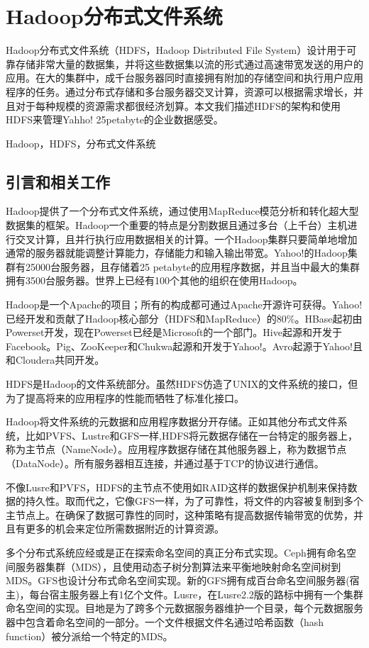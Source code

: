\chapter{Hadoop分布式文件系统}

\ECUSTabstract Hadoop分布式文件系统（HDFS，Hadoop Distributed File System）设计用于可靠存储非常大量的数据集，并将这些数据集以流的形式通过高速带宽发送的用户的应用。在大的集群中，成千台服务器同时直接拥有附加的存储空间和执行用户应用程序的任务。通过分布式存储和多台服务器交叉计算，资源可以根据需求增长，并且对于每种规模的资源需求都很经济划算。本文我们描述HDFS的架构和使用HDFS来管理Yahho! 25petabyte的企业数据感受。

\ECUSTkeywords Hadoop，HDFS，分布式文件系统


\section{引言和相关工作}

Hadoop提供了一个分布式文件系统，通过使用MapReduce模范分析和转化超大型数据集的框架。Hadoop一个重要的特点是分割数据且通过多台（上千台）主机进行交叉计算，且并行执行应用数据相关的计算。一个Hadoop集群只要简单地增加通常的服务器就能调整计算能力，存储能力和输入输出带宽。Yahoo!的Hadoop集群有25000台服务器，且存储着25 petabyte的应用程序数据，并且当中最大的集群拥有3500台服务器。世界上已经有100个其他的组织在使用Hadoop。

Hadoop是一个Apache的项目；所有的构成都可通过Apache开源许可获得。Yahoo!已经开发和贡献了Hadoop核心部分（HDFS和MapReduce）的80\%。HBase起初由Powerset开发，现在Powerset已经是Microsoft的一个部门。Hive起源和开发于Facebook。Pig、ZooKeeper和Chukwa起源和开发于Yahoo!。Avro起源于Yahoo!且和Cloudera共同开发。

HDFS是Hadoop的文件系统部分。虽然HDFS仿造了UNIX的文件系统的接口，但为了提高将来的应用程序的性能而牺牲了标准化接口。

Hadoop将文件系统的元数据和应用程序数据分开存储。正如其他分布式文件系统，比如PVFS、Lustre和GFS一样,HDFS将元数据存储在一台特定的服务器上，称为主节点（NameNode）。应用程序数据存储在其他服务器上，称为数据节点（DataNode）。所有服务器相互连接，并通过基于TCP的协议进行通信。

不像Lusre和PVFS，HDFS的主节点不使用如RAID这样的数据保护机制来保持数据的持久性。取而代之，它像GFS一样，为了可靠性，将文件的内容被复制到多个主节点上。在确保了数据可靠性的同时，这种策略有提高数据传输带宽的优势，并且有更多的机会来定位所需数据附近的计算资源。

多个分布式系统应经或是正在探索命名空间的真正分布式实现。Ceph拥有命名空间服务器集群（MDS），且使用动态子树分割算法来平衡地映射命名空间树到MDS。GFS也设计分布式命名空间实现。新的GFS拥有成百台命名空间服务器(宿主)，每台宿主服务器上有1亿个文件。Lusre，在Lusre2.2版的路标中拥有一个集群命名空间的实现。目地是为了跨多个元数据服务器维护一个目录，每个元数据服务器中包含着命名空间的一部分。一个文件根据文件名通过哈希函数（hash function）被分派给一个特定的MDS。

